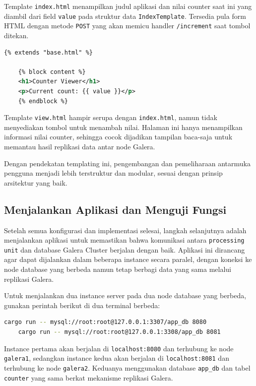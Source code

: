 Template \texttt{index.html} menampilkan judul aplikasi dan nilai counter saat ini yang diambil dari field \texttt{value} pada struktur data \texttt{IndexTemplate}. Tersedia pula form HTML dengan metode \texttt{POST} yang akan memicu handler \texttt{/increment} saat tombol ditekan.

\begin{lstlisting}[language=xml, caption={templates/view.html}]
	{% extends "base.html" %}
	
	{% block content %}
	<h1>Counter Viewer</h1>
	<p>Current count: {{ value }}</p>
	{% endblock %}
\end{lstlisting}

Template \texttt{view.html} hampir serupa dengan \texttt{index.html}, namun tidak menyediakan tombol untuk menambah nilai. Halaman ini hanya menampilkan informasi nilai counter, sehingga cocok dijadikan tampilan baca-saja untuk memantau hasil replikasi data antar node Galera.

Dengan pendekatan templating ini, pengembangan dan pemeliharaan antarmuka pengguna menjadi lebih terstruktur dan modular, sesuai dengan prinsip arsitektur yang baik.

\subsection{Menjalankan Aplikasi dan Menguji Fungsi}

Setelah semua konfigurasi dan implementasi selesai, langkah selanjutnya adalah menjalankan aplikasi untuk memastikan bahwa komunikasi antara \texttt{processing unit} dan database Galera Cluster berjalan dengan baik. Aplikasi ini dirancang agar dapat dijalankan dalam beberapa instance secara paralel, dengan koneksi ke node database yang berbeda namun tetap berbagi data yang sama melalui replikasi Galera.

Untuk menjalankan dua instance server pada dua node database yang berbeda, gunakan perintah berikut di dua terminal berbeda:

\begin{lstlisting}[language=bash, caption={Menjalankan dua server dengan koneksi berbeda}]
	cargo run -- mysql://root:root@127.0.0.1:3307/app_db 8080
	cargo run -- mysql://root:root@127.0.0.1:3308/app_db 8081
\end{lstlisting}

Instance pertama akan berjalan di \texttt{localhost:8080} dan terhubung ke node \texttt{galera1}, sedangkan instance kedua akan berjalan di \texttt{localhost:8081} dan terhubung ke node \texttt{galera2}. Keduanya menggunakan database \texttt{app\_db} dan tabel \texttt{counter} yang sama berkat mekanisme replikasi Galera.

